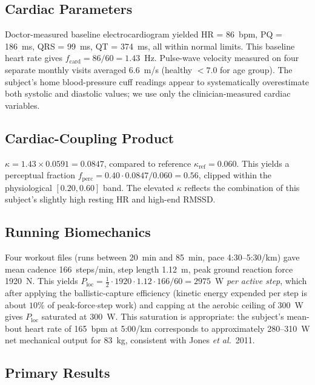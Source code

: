 \documentclass[11pt,twocolumn,a4paper]{article}
\theoremstyle{definition}
\theoremstyle{remark}
\newcommand{\Ploc}{P_{\mathrm{loc}}}
\newcommand{\fcard}{f_{\mathrm{card}}}
\begin{document}
\subsection{Cardiac Parameters}

Doctor-measured baseline electrocardiogram yielded
HR = 86~bpm, PQ = 186~ms, QRS = 99~ms, QT = 374~ms, all within
normal limits. This baseline heart rate gives
$\fcard = 86/60 = 1.43$~Hz. Pulse-wave velocity measured on
four separate monthly visits averaged $6.6$~m/s
(healthy $<7.0$ for age group). The subject's home blood-pressure
cuff readings appear to systematically overestimate both systolic
and diastolic values; we use only the clinician-measured cardiac
variables.

\subsection{Cardiac-Coupling Product}

$\kappa = 1.43\times 0.0591 = 0.0847$, compared to reference
$\kappa_{\mathrm{ref}}=0.060$. This yields a perceptual fraction
$f_{\mathrm{perc}}=0.40\cdot 0.0847/0.060 = 0.56$, clipped within the
physiological $[0.20,0.60]$ band. The elevated $\kappa$ reflects the
combination of this subject's slightly high resting HR and high-end
RMSSD.

\subsection{Running Biomechanics}

Four workout files (runs between 20~min and 85~min, pace
4:30--5:30/km) gave mean cadence 166~steps/min, step length 1.12~m,
peak ground reaction force 1920~N. This yields
$\Ploc = \tfrac{1}{2}\cdot 1920\cdot 1.12\cdot 166/60 = 2975$~W
\emph{per active step}, which after applying the ballistic-capture
efficiency (kinetic energy expended per step is about $10\%$ of
peak-force$\cdot$step work) and capping at the aerobic ceiling of
300~W gives $\Ploc$ saturated at 300~W. This saturation is
appropriate: the subject's mean-bout heart rate of 165~bpm at 5:00/km
corresponds to approximately 280--310~W net mechanical output for
83~kg, consistent with Jones \emph{et al.}\ 2011.

\subsection{Primary Results}
\end{document}

